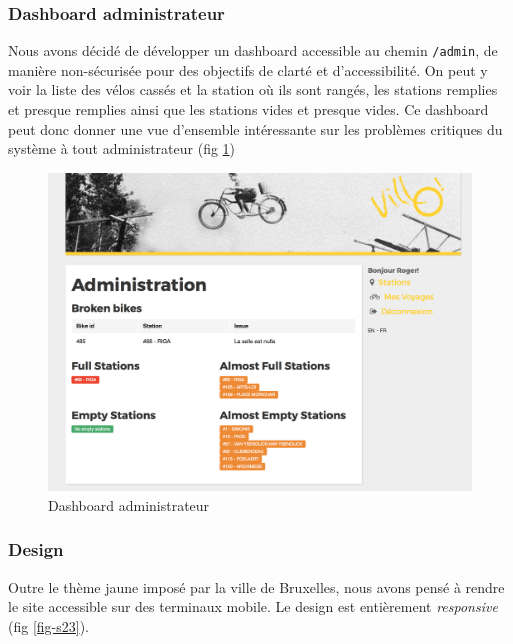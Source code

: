 \documentclass[a4paper]{article}
\begin{document}
    \subsubsection{Dashboard administrateur}
    Nous avons décidé de développer un dashboard accessible au chemin \texttt{/admin}, de manière non-sécurisée pour des objectifs de clarté et d'accessibilité. On peut y voir la liste des vélos cassés et la station où ils sont rangés, les stations remplies et presque remplies ainsi que les stations vides et presque vides. Ce dashboard peut donc donner une vue d'ensemble intéressante sur les problèmes critiques du système à tout administrateur (fig \ref{fig-s22})
    
    \begin{figure}
	\includegraphics[width=\textwidth]{s22.png}
    \caption{Dashboard administrateur}
    \label{fig-s22}
	\end{figure}
    
    \subsubsection{Design}
    Outre le thème jaune imposé par la ville de Bruxelles, nous avons pensé à rendre le site accessible sur des terminaux mobile. Le design est entièrement \textit{responsive} (fig \ref{fig-s23}).
    
\end{document}

